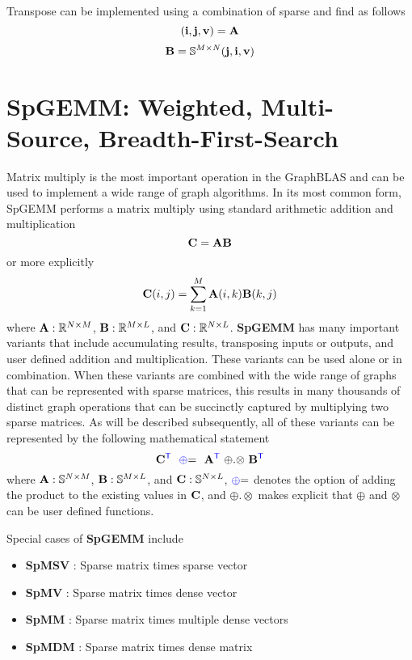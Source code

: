 Transpose can be implemented using a combination of sparse and find as follows
$$
	({\bf i},{\bf j},{\bf v}) = {\bf A}
$$
$$
   \mathbf{B} = \mathbb{S}^{M \times N}({\bf j},{\bf i},{\bf v})
$$

  
\section{SpGEMM: Weighted, Multi-Source, Breadth-First-Search}

Matrix multiply is the most important operation in the GraphBLAS and can be used to implement a wide range of graph algorithms.  In its most common form, SpGEMM performs a matrix multiply using standard arithmetic addition and multiplication
$$
   {\bf C} = {\bf A} {\bf B}
$$
or more explicitly
$$
   {\bf C}(i,j) = \sum_{k=1}^M {\bf A}(i,k) {\bf B}(k,j)
$$
where ${\bf A}: \mathbb{R}^{N \times M}$,  ${\bf B}: \mathbb{R}^{M \times L}$, and ${\bf C}: \mathbb{R}^{N \times L}$. {\bf SpGEMM} has many important variants that include accumulating results, transposing inputs or outputs, and user defined addition and multiplication.  These variants can be used alone or in combination.  When these variants are combined with the wide range of graphs that can be represented with sparse matrices, this results in many thousands of distinct graph operations that can be succinctly captured by multiplying two sparse matrices.   As will be described subsequently, all of these variants can be represented by the following mathematical statement
$$
   {\bf C}^{\textcolor{blue}{\sf T}} ~~ {\textcolor{blue}{\oplus}}{=} ~~ {\bf A}^{\textcolor{blue}{\sf T}} ~ {\oplus}.{\otimes} ~ {\bf B}^{\textcolor{blue}{\sf T}}
$$
where  ${\bf A}: \mathbb{S}^{N \times M}$,  ${\bf B}: \mathbb{S}^{M \times L}$, and ${\bf C}: \mathbb{S}^{N \times L}$, ${\textcolor{blue}{\oplus}}{=}$ denotes the option of adding the product to the existing values in ${\bf C}$, and ${\oplus}.{\otimes}$ makes explicit that ${\oplus}$ and ${\otimes}$ can be user defined functions.

Special cases of {\bf SpGEMM} include
\begin{itemize}
\item  {\bf SpMSV} : Sparse matrix times sparse vector
\item  {\bf SpMV} : Sparse matrix times dense vector
\item {\bf SpMM} : Sparse matrix times multiple dense vectors
\item {\bf SpMDM} : Sparse matrix times dense matrix
\end{itemize}

